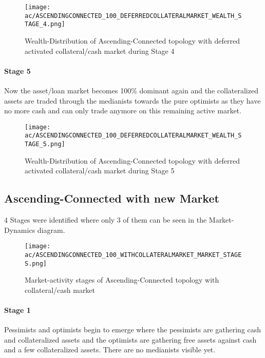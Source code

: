 \documentclass[Bachelorarbeit.tex]{subfiles}
\begin{document}
\begin{figure}[H]
	\centering
  \texttt{[image: ac/ASCENDINGCONNECTED\_100\_DEFERREDCOLLATERALMARKET\_WEALTH\_STAGE\_4.png]}
  	\caption{Wealth-Distribution of Ascending-Connected topology with deferred activated collateral/cash market during Stage 4}
	\label{fig:markets_ASCENDINGCONNECTED_100_DEFERREDCOLLATERALMARKET_WEALTH_STAGE_4}
\end{figure}

\paragraph{Stage 5}
Now the asset/loan market becomes 100\% dominant again and the collateralized assets are traded through the medianists towards the pure optimists as they have no more cash and can only trade anymore on this remaining active market.

\begin{figure}[H]
	\centering
  \texttt{[image: ac/ASCENDINGCONNECTED\_100\_DEFERREDCOLLATERALMARKET\_WEALTH\_STAGE\_5.png]}
  	\caption{Wealth-Distribution of Ascending-Connected topology with deferred activated collateral/cash market during Stage 5}	\label{fig:markets_ASCENDINGCONNECTED_100_DEFERREDCOLLATERALMARKET_WEALTH_STAGE_5}
\end{figure}

\subsection{Ascending-Connected with new Market}

4 Stages were identified where only 3 of them can be seen in the Market-Dynamics diagram.

\begin{figure}[H]
	\centering
  \texttt{[image: ac/ASCENDINGCONNECTED\_100\_WITHCOLLATERALMARKET\_MARKET\_STAGES.png]}
  	\caption{Market-activity stages of Ascending-Connected topology with collateral/cash market}
	\label{fig:markets_ASCENDINGCONNECTED_100_WITHCOLLATERALMARKET_MARKET_STAGES}
\end{figure}

\paragraph{Stage 1}
Pessimists and optimists begin to emerge where the pessimists are gathering cash and collateralized assets and the optimists are gathering free assets against cash and a few collateralized assets. There are no medianists visible yet.
\end{document}

